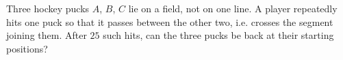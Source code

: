 Three hockey pucks $A$, $B$, $C$ lie on a field, not on one line. A player repeatedly hits one puck so that it passes between the other two, i.e. crosses the segment joining them. After $25$ such hits, can the three pucks be back at their starting positions?
